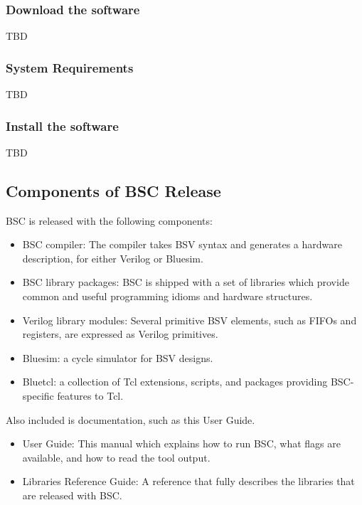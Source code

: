 \documentclass{article}
\begin{document}

\subsubsection{Download the software}

TBD


\subsubsection{System Requirements}

TBD


\subsubsection{Install the software}

TBD


\subsection{Components of BSC Release}

BSC is released with the following components:
\begin{itemize}
\item{BSC compiler:} The compiler takes BSV syntax and
generates a hardware description, for either Verilog or Bluesim.
\item{BSC library packages:} BSC is shipped with a set of
libraries which provide common and useful programming idioms and
 hardware structures.
\item{Verilog library modules:} Several primitive BSV elements, such as
 FIFOs and registers, are expressed as Verilog primitives.  
\item{Bluesim:}  a cycle simulator for BSV
designs.
\item{Bluetcl}:   a collection of Tcl
extensions, scripts, and packages
providing BSC-specific features to Tcl.
\end{itemize}

Also included is documentation, such as this User Guide.
\begin{itemize}
\item{User Guide}: This manual which explains how to run BSC,
what flags are available, and how to read the tool output.
\item{Libraries Reference Guide}: A reference that fully
describes the libraries that are released with BSC.
\end{itemize}
\end{document}
